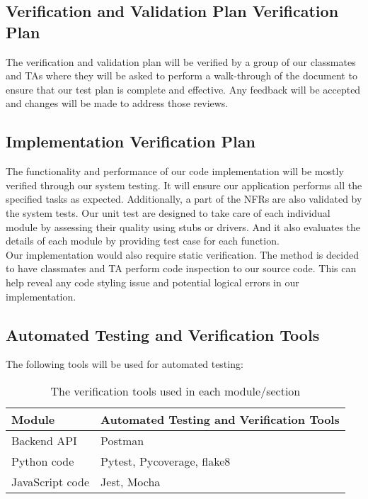 \documentclass[12pt, titlepage]{article}
\begin{document}
\subsection{Verification and Validation Plan Verification Plan}



\noindent
The verification and validation plan will be verified by a group of our classmates and TAs where they will be asked to perform a walk-through of the document to ensure that our test plan is complete and effective. Any feedback will be accepted and changes will be made to address those reviews.

\subsection{Implementation Verification Plan}

  
The functionality and performance of our code implementation will be mostly verified through our system testing. It will ensure our application performs all the specified tasks as expected. Additionally, a part of the NFRs are also validated by the system tests. Our unit test are designed to take care of each individual module by assessing their quality using stubs or drivers. And it also evaluates the details of each module by providing test case for each function.\\
\noindent
Our implementation would also require static verification. The method is decided to have classmates and TA perform code inspection to our source code. This can help reveal any code styling issue and potential logical errors in our implementation.

\subsection{Automated Testing and Verification Tools}

The following tools will be used for automated testing:

\begin{table}[!h]
    \centering
    \begin{tabular}{l|l}
    \hline
        \textbf{Module} & \textbf{Automated Testing and Verification Tools} \\ \hline
        Backend API & Postman \\ \hline
        Python code & Pytest, Pycoverage, flake8 \\ \hline
        JavaScript code & Jest, Mocha \\ \hline
    \end{tabular}
    \caption{The verification tools used in each module/section}
\end{table}
\end{document}
